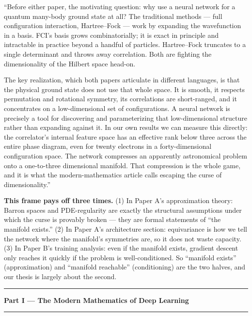 \documentclass[11pt]{article}
\begin{document}
\begin{say}
``Before either paper, the motivating question: why use a neural network for a quantum many-body
ground state at all? The traditional methods --- full configuration interaction, Hartree--Fock ---
work by expanding the wavefunction in a basis. FCI's basis grows combinatorially; it is exact in
principle and intractable in practice beyond a handful of particles. Hartree--Fock truncates to a
single determinant and throws away correlation. Both are fighting the dimensionality of the Hilbert
space head-on.

The key realization, which both papers articulate in different languages, is that the physical
ground state does not use that whole space. It is smooth, it respects permutation and rotational
symmetry, its correlations are short-ranged, and it concentrates on a low-dimensional set of
configurations. A neural network is precisely a tool for discovering and parameterizing that
low-dimensional structure rather than expanding against it. In our own results we can measure this
directly: the correlator's internal feature space has an effective rank below three across the
entire phase diagram, even for twenty electrons in a forty-dimensional configuration space. The
network compresses an apparently astronomical problem onto a one-to-three dimensional manifold.
That compression is the whole game, and it is what the modern-mathematics article calls escaping
the curse of dimensionality.''
\end{say}

\begin{depth}
\textbf{This frame pays off three times.} (1) In Paper A's approximation theory: Barron spaces and
PDE-regularity are exactly the structural assumptions under which the curse is provably broken ---
they are formal statements of ``the manifold exists.'' (2) In Paper A's architecture section:
equivariance is how we tell the network where the manifold's symmetries are, so it does not waste
capacity. (3) In Paper B's training analysis: even if the manifold exists, gradient descent only
reaches it quickly if the problem is well-conditioned. So ``manifold exists'' (approximation) and
``manifold reachable'' (conditioning) are the two halves, and our thesis is largely about the
second.
\end{depth}

\vspace{2em}\hrule
\begin{center}\Large\textbf{Part I --- The Modern Mathematics of Deep Learning}\end{center}
\hrule\vspace{1em}
\end{document}
